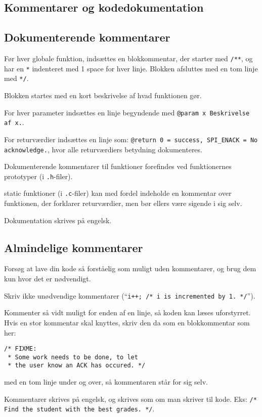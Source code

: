 \documentclass[article, 10pt]{memoir}
\let\tempone\itemize
\let\temptwo\enditemize
\renewenvironment{itemize}{\tempone\firmlist}{\temptwo}
\begin{document}
\begin{multicols}{2}
    \chapter{Kommentarer og kodedokumentation}

    \section{Dokumenterende kommentarer}
    \begin{itemize}
        \item Før hver globale funktion, indsættes en blokkommentar, der starter med \texttt{/**}, og har en \texttt{*} indenteret med 1 space for hver linje. Blokken afsluttes med en tom linje med \texttt{*/}.
        \item Blokken startes med en kort beskrivelse af hvad funktionen gør.
        \item For hver parameter indsættes en linje begyndende med \texttt{@param x Beskrivelse af x.}.
        \item For returværdier indsættes en linje som: \texttt{@return 0 = success, SPI\_ENACK = No acknowledge.}, hvor alle returværdiers betydning dokumenteres.
        \item Dokumenterende kommentarer til funktioner forefindes ved funktionernes prototyper (i \texttt{.h}-filer).
        \item static funktioner (i \texttt{.c}-filer) kan med fordel indeholde en kommentar over funktionen, der forklarer returværdier, men bør ellers være sigende i sig selv.
        \item Dokumentation skrives på engelsk.
    \end{itemize}

    \section{Almindelige kommentarer}
    \begin{itemize}
        \item Forsøg at lave din kode så forståelig som muligt uden kommentarer, og brug dem kun hvor det er nødvendigt.
        \item Skriv ikke unødvendige kommentarer (``\texttt{i++; /* i is incremented by 1. */}'').
        \item Kommenter så vidt muligt for enden af en linje, så koden kan læses uforstyrret. Hvis en stor kommentar skal knyttes, skriv den da som en blokkommentar som her:
            \begin{lstlisting}
/* FIXME:
 * Some work needs to be done, to let
 * the user know an ACK has occured. */
            \end{lstlisting}
            med en tom linje under og over, så kommentaren står for sig selv.
        \item Kommentarer skrives på engelsk, og skrives som om man skriver til kode. Eks: \texttt{/* Find the student with the best grades. */}.
    \end{itemize}


\end{multicols}
\end{document}
